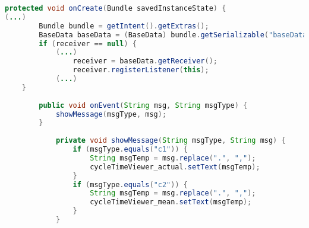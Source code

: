 \label{appCode:klasseCycleTime}
\begin{lstlisting}[language=java, caption=Klasse CycleTime]
    protected void onCreate(Bundle savedInstanceState) {
(...)
        Bundle bundle = getIntent().getExtras();
        BaseData baseData = (BaseData) bundle.getSerializable("baseData");
        if (receiver == null) {
            (...)
                receiver = baseData.getReceiver();
                receiver.registerListener(this);
            (...)
    }
    
        public void onEvent(String msg, String msgType) {
            showMessage(msgType, msg);
        }
        
            private void showMessage(String msgType, String msg) {
                if (msgType.equals("c1")) {
                    String msgTemp = msg.replace(".", ",");
                    cycleTimeViewer_actual.setText(msgTemp);
                }
                if (msgType.equals("c2")) {
                    String msgTemp = msg.replace(".", ",");
                    cycleTimeViewer_mean.setText(msgTemp);
                }
            }
\end{lstlisting}
